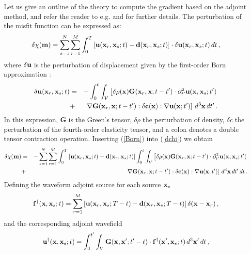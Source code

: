 Let us give an outline of the theory to compute the gradient based on the adjoint method, and refer the reader to e.g. \cite{TrTaLi05}
and \cite{TrKoLi08} for further details. The perturbation of the misfit function can be expressed as:
\begin{equation}
\delta \chi (\mathbf{m}) = \sum_{s=1}^N\sum_{r=1}^M \int_0^T \left[\mathbf{u}(\mathbf{x}_r, \mathbf{x}_s; t) - \mathbf{d}(\mathbf{x}_r, \mathbf{x}_s; t)\right]\cdot \delta
\mathbf{u}(\mathbf{x}_r, \mathbf{x}_s; t) \, dt \, ,
\label{dchi}
\end{equation}
where $\delta\mathbf{u}$ is the perturbation of displacement given by the first-order Born approximation \cite[e.g.,][]{Hud77}:
\begin{eqnarray}
\delta \mathbf{u} (\mathbf{x}_r, \mathbf{x}_s; t) & = & -\int_0^t \int_V
\left[\delta\rho(\mathbf{x})\mathbf{G}(\mathbf{x}_r,\mathbf{x};t-t')\cdot\partial^2_{t'}\mathbf{u}(\mathbf{x},\mathbf{x}_s;t') \right. \nonumber \\
& + & \left. \nabla \mathbf{G}(\mathbf{x}_r,\mathbf{x};t-t'):\delta \mathbf{c}(\mathbf{x}): \nabla\mathbf{u}(\mathbf{x};t') \right] \, d^3\mathbf{x} \, dt' \, .
\label{Born}
\end{eqnarray}
In this expression, $\mathbf{G}$ is the Green's tensor, $\delta\rho$ the perturbation of density, $\delta c$ the perturbation of the fourth-order elasticity
tensor,
and a colon denotes a double tensor contraction operation.
Inserting (\ref{Born}) into (\ref{dchi}) we obtain
\begin{eqnarray}
\delta \chi (\mathbf{m}) & = & -\sum_{s=1}^N\sum_{r=1}^M \int_0^T \left[\mathbf{u}(\mathbf{x}_r, \mathbf{x}_s; t) - \mathbf{d}(\mathbf{x}_r, \mathbf{x}_s; t)\right] \int_0^t \int_V
\left[\delta\rho(\mathbf{x})\mathbf{G}(\mathbf{x}_r,\mathbf{x};t-t')\cdot\partial^2_{t'}\mathbf{u}(\mathbf{x},\mathbf{x}_s;t') \right. \nonumber \\
& + & \left. \nabla \mathbf{G}(\mathbf{x}_r,\mathbf{x};t-t'):\delta \mathbf{c}(\mathbf{x}):\nabla\mathbf{u}(\mathbf{x},t') \right] \, d^3\mathbf{x} \, dt' \, dt \,.
\end{eqnarray}
Defining the waveform adjoint source for each source $\mathbf{x}_s$
\begin{equation}
\mathbf{f}^\dagger(\mathbf{x},\mathbf{x}_s;t) = \sum_{r=1}^M  \left[\mathbf{u}(\mathbf{x}_r, \mathbf{x}_s; T-t) - \mathbf{d}(\mathbf{x}_r, \mathbf{x}_s; T-t)\right] \delta(\mathbf{x}-\mathbf{x}_r) \, ,
\end{equation}
and the corresponding adjoint wavefield
\begin{equation}
\mathbf{u}^\dagger(\mathbf{x},\mathbf{x}_s;t) = \int_0^{t'}\int_V\mathbf{G}(\mathbf{x},\mathbf{x}';t'-t)\cdot\mathbf{f}^\dagger(\mathbf{x}',\mathbf{x}_s;t)\, d^3\mathbf{x}' \, dt \, ,
\end{equation}
